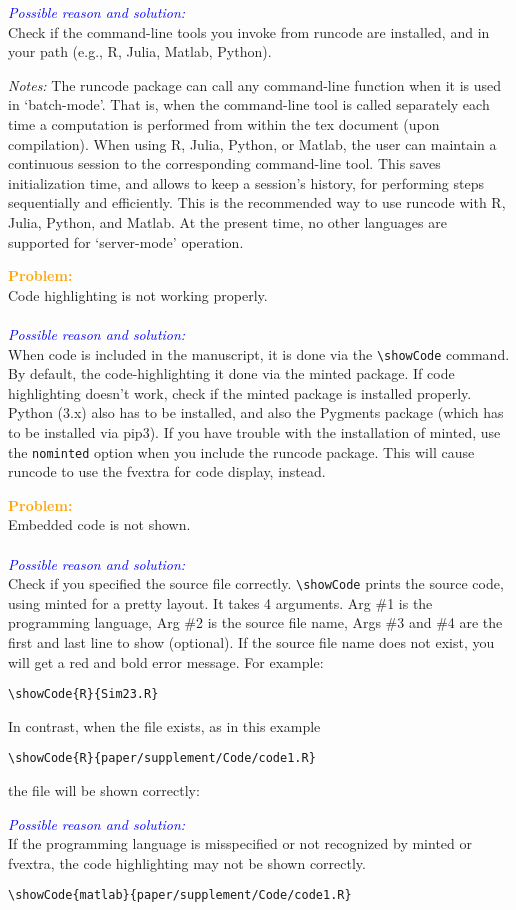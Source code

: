 \documentclass[a4paper,10pt]{article}
\newcommand{\prob}[1] {\bigskip\noindent\textbf{\textcolor{orange}{Problem:}}\\#1\\\\}
\newcommand{\cause}[1] {\noindent\textit{\textcolor{blue}{Possible reason and solution:}}\\#1}
\newcommand{\cmnt}[1] {\bigskip\noindent\textit{Notes:} #1}
\begin{document}
\cause\bgroup
Check if the command-line tools you invoke from runcode are installed, and in your path (e.g., R, Julia, Matlab, Python).
\egroup

\cmnt\bgroup
The runcode package can call any command-line function when it is used in `batch-mode'. That is, when the command-line tool is called separately each time a computation is performed from within the tex document (upon compilation). When using R, Julia, Python, or Matlab, the user can maintain a continuous session to the corresponding command-line tool. This saves initialization time, and allows to keep a session's history, for performing steps sequentially and efficiently. This is the recommended way to use runcode with R, Julia, Python, and Matlab.
At the present time, no other languages are supported for `server-mode' operation.
\egroup


\prob{Code highlighting is not working properly.}
\cause\bgroup
When code is included in the manuscript, it is done via the \verb|\showCode| command. By default, the code-highlighting it done via the minted package. If code highlighting doesn't work, check if the minted package is installed properly. Python (3.x) also has to be installed, and also the Pygments package (which has to be installed via pip3). If you have trouble with the installation of minted, use the \verb|nominted| option when you include the runcode package. This will cause runcode to use the fvextra for code display, instead.
\egroup


\prob{Embedded code is not shown.}
\cause\bgroup
Check if you specified the source file correctly.
\verb|\showCode| prints the source code, using minted for a pretty layout. It takes 4 arguments.
Arg \#1 is the programming language,
Arg \#2 is the source file name,
Args \#3 and \#4 are the first and last line to show (optional).
If the source file name does not exist, you will get a red and bold error message. For example:
\begin{verbatim}\showCode{R}{Sim23.R}
\end{verbatim}
\noindent
In contrast, when the file exists, as in this example
\begin{verbatim}\showCode{R}{paper/supplement/Code/code1.R}
\end{verbatim}
the file will be shown correctly:
\egroup

\cause\bgroup
If the programming language is misspecified or not recognized by minted or fvextra, the code highlighting may not be shown correctly.
\begin{verbatim}\showCode{matlab}{paper/supplement/Code/code1.R}
\end{verbatim}
\egroup
\end{document}
